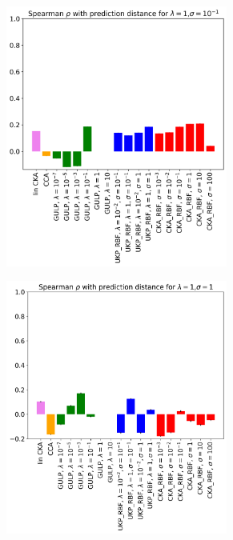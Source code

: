 \documentclass{article}
\theoremstyle{plain}
\begin{document}
\begin{figure}[!h]
    \vspace{0.5cm}  %
    
    \begin{subfigure}[b]{0.45\textwidth}
        \includegraphics[width=0.8\textwidth]{Appendix figures/mnist_experiments/krrgen/png/generalization(includingCKARBF)_lambda1_sigma0.1.png}
    \end{subfigure}
    \hfill
    \begin{subfigure}[b]{0.45\textwidth}
        \includegraphics[width=0.8\textwidth]{Appendix figures/mnist_experiments/krrgen/png/generalization(includingCKARBF)_lambda1_sigma1.png}
    \end{subfigure}


\end{figure}
\end{document}
